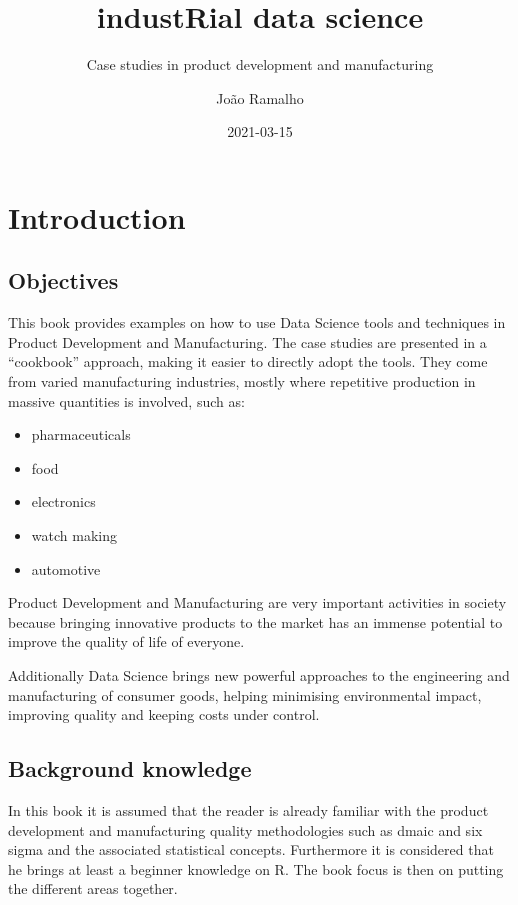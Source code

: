 \documentclass[
]{book}
\title{industRial data science}
\subtitle{Case studies in product development and manufacturing}
\author{João Ramalho}
\date{2021-03-15}
\providecommand{\tightlist}{%
  \setlength{\itemsep}{0pt}\setlength{\parskip}{0pt}}
\begin{document}
\maketitle

{
\setcounter{tocdepth}{1}
\tableofcontents
}
\hypertarget{introduction}{%
\chapter*{Introduction}\label{introduction}}

\hypertarget{objectives}{%
\section{Objectives}\label{objectives}}

This book provides examples on how to use Data Science tools and techniques in Product Development and Manufacturing. The case studies are presented in a ``cookbook'' approach, making it easier to directly adopt the tools. They come from varied manufacturing industries, mostly where repetitive production in massive quantities is involved, such as:

\begin{itemize}
\tightlist
\item
  pharmaceuticals
\item
  food
\item
  electronics
\item
  watch making
\item
  automotive
\end{itemize}

Product Development and Manufacturing are very important activities in society because bringing innovative products to the market has an immense potential to improve the quality of life of everyone.

Additionally Data Science brings new powerful approaches to the engineering and manufacturing of consumer goods, helping minimising environmental impact, improving quality and keeping costs under control.

\hypertarget{background-knowledge}{%
\section{Background knowledge}\label{background-knowledge}}

In this book it is assumed that the reader is already familiar with the product development and manufacturing quality methodologies such as dmaic and six sigma and the associated statistical concepts. Furthermore it is considered that he brings at least a beginner knowledge on R. The book focus is then on putting the different areas together.
\end{document}
